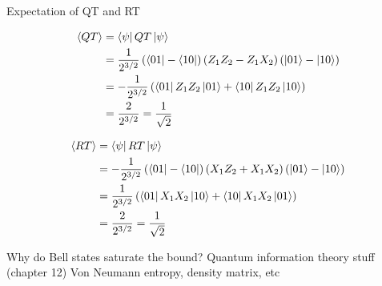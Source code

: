 \documentclass[aspectratio=1610]{beamer}					%
\begin{document}
\begin{frame}{Expectation of QT and RT}

\begin{align*}
\langle QT \rangle &= \bra{\psi}QT\ket{\psi}\\
&= \frac{1}{2^{3/2}}\left(\bra{01} - \bra{10}\right) \left(Z_{1}Z_{2}-Z_{1}X_{2}\right)\left(\ket{01} - \ket{10}\right)\\
&= -\frac{1}{2^{3/2}}\left(\bra{01}Z_{1}Z_{2}\ket{01} + \bra{10}Z_{1}Z_{2}\ket{10}\right)\\
&= \frac{2}{2^{3/2}} = \frac{1}{\sqrt{2}}
\end{align*}

\begin{align*}
\langle RT \rangle &= \bra{\psi}RT\ket{\psi}\\
&= -\frac{1}{2^{3/2}}\left(\bra{01} - \bra{10}\right) \left(X_{1}Z_{2}+X_{1}X_{2}\right)\left(\ket{01} - \ket{10}\right)\\
&= \frac{1}{2^{3/2}}\left(\bra{01}X_{1}X_{2}\ket{10} + \bra{10}X_{1}X_{2}\ket{01}\right)\\
&= \frac{2}{2^{3/2}} = \frac{1}{\sqrt{2}}
\end{align*}

\end{frame}

\begin{frame}{Why do Bell states saturate the bound?}
Quantum information theory stuff (chapter 12)
Von Neumann entropy, density matrix, etc
\end{frame}
\end{document}
